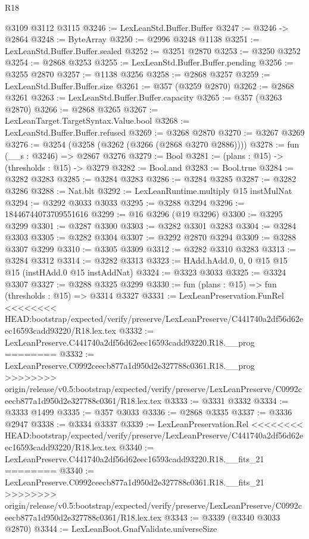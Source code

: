 \begin{lexlean}{R18}
\begin{coremodule}
{{{{{{{{{{{{{{{{{{{{{{{{{{{{{{{{{{{{{{{{{{{{{{{{{{{{{{{{{{{{{{{{{{{{{{{{{{{{{{{{{{{{{{{{{{{{{{{{{{{{{{{{{{{{{{{{{{{{{{{{{{{{{{{{{{{{{{{{{{{{{{{    @3109
    @3112
    @3115
@3246 := LexLeanStd.Buffer.Buffer
@3247 := @3246 -> @2864
@3248 := ByteArray
@3250 := @2996 @3248 @1138
@3251 := LexLeanStd.Buffer.Buffer.sealed
@3252 := @3251 @2870
@3253 := @3250 @3252
@3254 := @2868 @3253
@3255 := LexLeanStd.Buffer.Buffer.pending
@3256 := @3255 @2870
@3257 := @1138 @3256
@3258 := @2868 @3257
@3259 := LexLeanStd.Buffer.Buffer.size
@3261 := @357 (@3259 @2870)
@3262 := @2868 @3261
@3263 := LexLeanStd.Buffer.Buffer.capacity
@3265 := @357 (@3263 @2870)
@3266 := @2868 @3265
@3267 := LexLeanTarget.TargetSyntax.Value.bool
@3268 := LexLeanStd.Buffer.Buffer.refused
@3269 := @3268 @2870
@3270 := @3267 @3269
@3276 := @3254 (@3258 (@3262 (@3266 (@2868 @3270 @2886))))
@3278 := fun (__s : @3246) => @2867 @3276
@3279 := Bool
@3281 := (plans : @15) -> (thresholds : @15) -> @3279
@3282 := Bool.and
@3283 := Bool.true
@3284 := @3282 @3283
@3285 := @3284 @3283
@3286 := @3284 @3285
@3287 := @3282 @3286
@3288 := Nat.blt
@3292 := LexLeanRuntime.multiply @15 instMulNat
@3294 := @3292 @3033 @3033
@3295 := @3288 @3294
@3296 := 18446744073709551616
@3299 := @16 @3296 (@19 @3296)
@3300 := @3295 @3299
@3301 := @3287 @3300
@3303 := @3282 @3301 @3283
@3304 := @3284 @3303
@3305 := @3282 @3304
@3307 := @3292 @2870 @3294
@3309 := @3288 @3307 @3299
@3310 := @3305 @3309
@3312 := @3282 @3310 @3283
@3313 := @3284 @3312
@3314 := @3282 @3313
@3323 := HAdd.hAdd.{0, 0, 0} @15 @15 @15 (instHAdd.{0} @15 instAddNat)
@3324 := @3323 @3033
@3325 := @3324 @3307
@3327 := @3288 @3325 @3299
@3330 := fun (plans : @15) => fun (thresholds : @15) => @3314 @3327
@3331 := LexLeanPreservation.FunRel
<<<<<<<< HEAD:bootstrap/expected/verify/preserve/LexLeanPreserve/C441740a2df56d62eec16593cadd93220/R18.lex.tex
@3332 := LexLeanPreserve.C441740a2df56d62eec16593cadd93220.R18.__prog
========
@3332 := LexLeanPreserve.C0992ceecb877a1d950d2e327788c0361.R18.__prog
>>>>>>>> origin/release/v0.5:bootstrap/expected/verify/preserve/LexLeanPreserve/C0992ceecb877a1d950d2e327788c0361/R18.lex.tex
@3333 := @3331 @3332
@3334 := @3333 @1499
@3335 := @357 @3033
@3336 := @2868 @3335
@3337 := @3336 @2947
@3338 := @3334 @3337
@3339 := LexLeanPreservation.Rel
<<<<<<<< HEAD:bootstrap/expected/verify/preserve/LexLeanPreserve/C441740a2df56d62eec16593cadd93220/R18.lex.tex
@3340 := LexLeanPreserve.C441740a2df56d62eec16593cadd93220.R18.__fits_21
========
@3340 := LexLeanPreserve.C0992ceecb877a1d950d2e327788c0361.R18.__fits_21
>>>>>>>> origin/release/v0.5:bootstrap/expected/verify/preserve/LexLeanPreserve/C0992ceecb877a1d950d2e327788c0361/R18.lex.tex
@3343 := @3339 (@3340 @3033 @2870)
@3344 := LexLeanBoot.GnafValidate.universeSize
}}}}}}}}}}}}}}}}}}}}}}}}}}}}}}}}}}}}}}}}}}}}}}}}}}}}}}}}}}}}}}}}}}}}}}}}}}}}}}}}}}}}}}}}}}}}}}}}}}}}}}}}}}}}}}}}}}}}}}}}}}}}}}}}}}}}}}}}}}}}}}}
\end{coremodule}
\end{lexlean}
